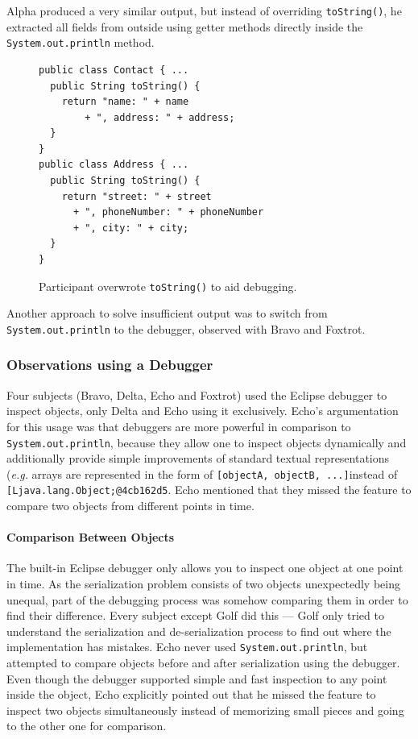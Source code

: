\documentclass[english]{scrartcl}
\newcommand\nes[1]{\nbc{nes}{#1}{blue}}
\newcommand{\eg}{\emph{e.g.}\xspace}
\newcommand{\println}{\texttt{Sys\-tem.\-out.\-println}\xspace}
\begin{document}
Alpha produced a very similar output, but instead of overriding \texttt{toString()}, he extracted all fields from outside using getter methods directly inside the \println method. \nes{Reference the figure.}

\begin{figure}[h]
\begin{lstlisting}
public class Contact { ...
  public String toString() {
	return "name: " + name
		+ ", address: " + address;
  }
}
public class Address { ...
  public String toString() {
	return "street: " + street
	  + ", phoneNumber: " + phoneNumber
	  + ", city: " + city;
  }
}
\end{lstlisting}
  \caption{Participant overwrote \texttt{toString()} to aid debugging.}
\end{figure}

Another approach to solve insufficient output was to switch from \println to the debugger, observed with Bravo and Foxtrot.

\subsubsection{Observations using a Debugger}
Four subjects (Bravo, Delta, Echo and Foxtrot) used the Eclipse debugger to inspect objects, only Delta and Echo using it exclusively.
Echo's argumentation for this usage was that debuggers are more powerful in comparison to \println, because they allow one to inspect objects dynamically and additionally provide simple improvements of standard textual representations (\eg arrays are represented in the form of \texttt{[objectA, objectB, ...]}instead of \texttt{[Ljava.lang.Object;@4cb162d5}.
Echo mentioned that they missed the feature to compare two objects from different points in time.

\paragraph{Comparison Between Objects}
The built-in Eclipse debugger only allows you to inspect one object at one point in time.
As the serialization problem consists of two objects unexpectedly  being unequal, part of the debugging process was somehow comparing them in order to find their difference.
Every subject except Golf did this --- Golf only tried to understand the serialization and de-serialization process to find out where the implementation has mistakes.
Echo never used \println, but attempted to compare objects before and after serialization using the debugger.
Even though the debugger supported simple and fast inspection to any point inside the object, Echo explicitly pointed out that he missed the feature to inspect two objects simultaneously instead of memorizing small pieces and going to the other one for comparison.
\end{document}
